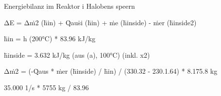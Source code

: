 Energiebilanz im Reaktor i Halobens speern

ΔE = Δṁ2 (h̄in) + Q̇auṡi (h̄in) + ṁe (h̄inside) - ṁer (h̄inside2)

h̄in = h (200°C) * 83.96 kJ/kg

h̄inside = 3.632 kJ/kg (aus (a), 100°C) (inkl. x2)

Δṁ2 = (-Q̇aus * ṁer (h̄inside) / h̄in) / (330.32 - 230.1.64) * 8.175.8 kg

35.000 1/s * 5755 kg / 83.96